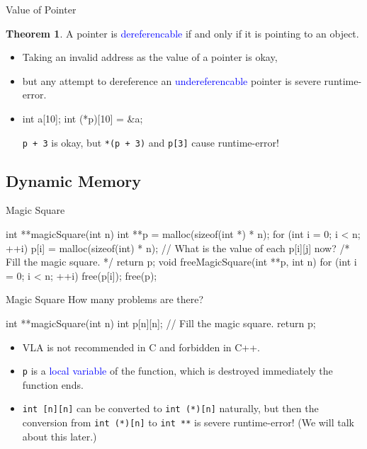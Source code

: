 \documentclass{beamer}
\newcommand{\blue}[1]{\textcolor{blue}{#1}}
\newcommand{\ttt}[1]{\texttt{#1}}
\theoremstyle{definition}
\newtheorem{thm}{Theorem}
\begin{document}
\begin{frame}[fragile]{Value of Pointer}
    \begin{thm}
        A pointer is \blue{dereferencable} if and only if it is pointing to an object.
    \end{thm}
    \begin{itemize}
        \item Taking an invalid address as the value of a pointer is okay,
        \item but any attempt to dereference an \blue{undereferencable} pointer is severe runtime-error.
        \pause
        \item \begin{cpp}
int a[10];
int (*p)[10] = &a;
        \end{cpp}
        \ttt{p + 3} is okay, but \ttt{*(p + 3)} and \ttt{p[3]} cause runtime-error!
    \end{itemize}
\end{frame}

\subsection{Dynamic Memory}

\begin{frame}[fragile]{Magic Square}
    \begin{cpp}
int **magicSquare(int n) {
  int **p = malloc(sizeof(int *) * n);
  for (int i = 0; i < n; ++i)
    p[i] = malloc(sizeof(int) * n);
  // What is the value of each p[i][j] now?
  /* Fill the magic square. */
  return p;
}
void freeMagicSquare(int **p, int n) {
  for (int i = 0; i < n; ++i)
    free(p[i]);
  free(p);
}
    \end{cpp}
\end{frame}

\begin{frame}[fragile]{Magic Square}
    How many problems are there?
    \begin{cpp}
int **magicSquare(int n) {
  int p[n][n];
  // Fill the magic square.
  return p;
}
    \end{cpp}
    \pause
    \begin{itemize}
        \item VLA is not recommended in C and forbidden in C++.
        \item \ttt{p} is a \blue{local variable} of the function, which is destroyed immediately the function ends.
        \item \ttt{int [n][n]} can be converted to \ttt{int (*)[n]} naturally, but then the conversion from \ttt{int (*)[n]} to \ttt{int **} is severe runtime-error! (We will talk about this later.)
    \end{itemize}
\end{frame}
\end{document}
